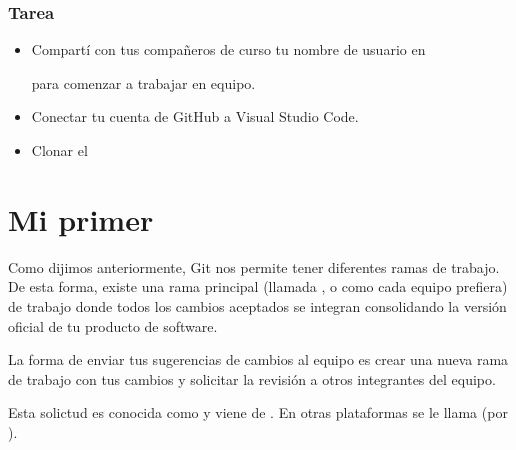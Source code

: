 \documentclass[a5paper,9pt,spanish]{sphinxmanual}
\begin{document}
\noindent{}


\subsection{Tarea}
\label{\detokenize{github:tarea}}\begin{itemize}
\item {} 
\sphinxAtStartPar
Compartí con tus compañeros de curso tu nombre de usuario
en %
\begin{footnote}[8]\sphinxAtStartFootnote
{}
%
\end{footnote} para comenzar a trabajar en equipo.

\item {} 
\sphinxAtStartPar
Conectar tu cuenta de GitHub a Visual Studio Code.

\item {} 
\sphinxAtStartPar
Clonar el %
\begin{footnote}[9]\sphinxAtStartFootnote
{}
%
\end{footnote}

\end{itemize}

\sphinxstepscope


\chapter{Mi primer }
\label{\detokenize{mi-primer-pr:mi-primer-pr}}\label{\detokenize{mi-primer-pr::doc}}
\sphinxAtStartPar
Como dijimos anteriormente, Git nos permite tener diferentes ramas de trabajo.
De esta forma, existe una rama principal (llamada ,  o como
cada equipo prefiera) de trabajo donde todos los cambios aceptados se integran
consolidando la versión oficial de tu producto de software.

\sphinxAtStartPar
La forma de enviar tus sugerencias de cambios al equipo es crear una nueva rama
de trabajo con tus cambios y solicitar la revisión a otros integrantes del equipo.

\sphinxAtStartPar
Esta solictud es conocida como  y viene de . En otras plataformas
se le llama  (por ).
\end{document}
